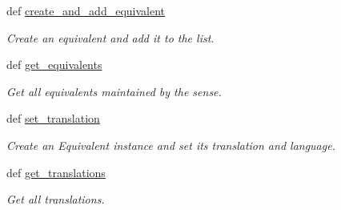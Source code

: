 \begin{DoxyCompactItemize}
def \hyperlink{classlmf_1_1src_1_1core_1_1sense_1_1_sense_a6004e31b078cad1d029283c4e3fedfc2}{create\+\_\+and\+\_\+add\+\_\+equivalent}
\begin{DoxyCompactList}\small\item\em Create an equivalent and add it to the list. \end{DoxyCompactList}\item 
def \hyperlink{classlmf_1_1src_1_1core_1_1sense_1_1_sense_ad01163c4440025fe86e4c00734aa8894}{get\+\_\+equivalents}
\begin{DoxyCompactList}\small\item\em Get all equivalents maintained by the sense. \end{DoxyCompactList}\item 
def \hyperlink{classlmf_1_1src_1_1core_1_1sense_1_1_sense_a97469fcc2116bb7b0dbf4826161512bd}{set\+\_\+translation}
\begin{DoxyCompactList}\small\item\em Create an Equivalent instance and set its translation and language. \end{DoxyCompactList}\item 
def \hyperlink{classlmf_1_1src_1_1core_1_1sense_1_1_sense_abeaa946d4c063f6784b84e443a102c2c}{get\+\_\+translations}
\begin{DoxyCompactList}\small\item\em Get all translations. \end{DoxyCompactList}\end{DoxyCompactItemize}
